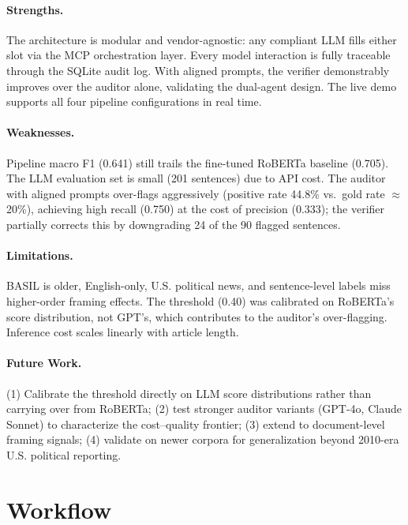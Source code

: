 \documentclass[11pt]{article}
\begin{document}
\paragraph{Strengths.}
The architecture is modular and vendor-agnostic: any compliant LLM fills either slot via the MCP orchestration layer. Every model interaction is fully traceable through the SQLite audit log. With aligned prompts, the verifier demonstrably improves over the auditor alone, validating the dual-agent design. The live demo supports all four pipeline configurations in real time.

\paragraph{Weaknesses.}
Pipeline macro F1 (0.641) still trails the fine-tuned RoBERTa baseline (0.705). The LLM evaluation set is small (201 sentences) due to API cost. The auditor with aligned prompts over-flags aggressively (positive rate 44.8\% vs.\ gold rate $\approx$20\%), achieving high recall (0.750) at the cost of precision (0.333); the verifier partially corrects this by downgrading 24 of the 90 flagged sentences.

\paragraph{Limitations.}
BASIL is older, English-only, U.S. political news, and sentence-level labels miss higher-order framing effects. The threshold (0.40) was calibrated on RoBERTa's score distribution, not GPT's, which contributes to the auditor's over-flagging. Inference cost scales linearly with article length.

\paragraph{Future Work.}
(1) Calibrate the threshold directly on LLM score distributions rather than carrying over from RoBERTa; (2) test stronger auditor variants (GPT-4o, Claude Sonnet) to characterize the cost--quality frontier; (3) extend to document-level framing signals; (4) validate on newer corpora for generalization beyond 2010-era U.S. political reporting.

\section{Workflow}
\end{document}
